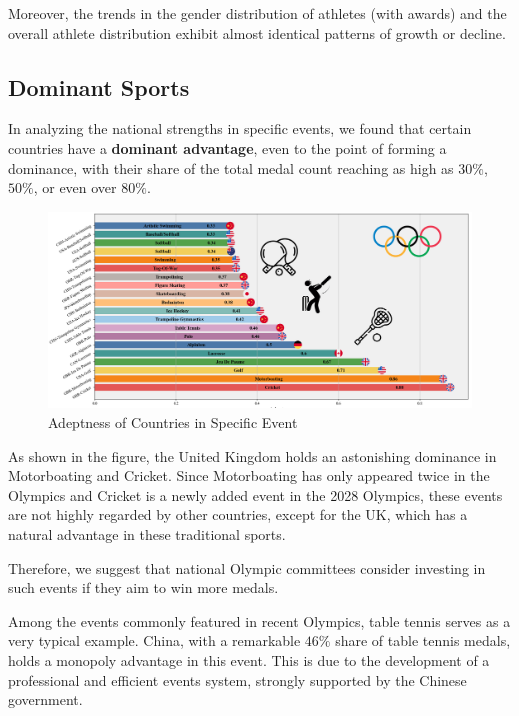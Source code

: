 \documentclass[12pt]{article}  %
\begin{document}
Moreover, the trends in the gender distribution of athletes (with awards) and the overall athlete distribution exhibit almost identical patterns of growth or decline.










\subsection{Dominant Sports}

In analyzing the national strengths in specific events, we found that certain countries have a \textbf{dominant advantage}, even to the point of forming a dominance, with their share of the total medal count reaching as high as \( 30\% \), \( 50\% \), or even over \textbf{\( 80\% \)}.



\begin{figure}[H]
	\centering
	\includegraphics[width=16cm]{img/Monopolized Sports.png}
	\caption{Adeptness of Countries in Specific Event}
	\label{fig:aa}
\end{figure}

As shown in the figure, the United Kingdom holds an astonishing dominance in Motorboating and Cricket. Since Motorboating has only appeared twice in the Olympics and Cricket is a newly added event in the 2028 Olympics, these events are not highly regarded by other countries, except for the UK, which has a natural advantage in these traditional sports.

Therefore, we suggest that national Olympic committees consider investing in such events if they aim to win more medals.


Among the events commonly featured in recent Olympics, table tennis serves as a very typical example. China, with a remarkable \( 46\% \) share of table tennis medals, holds a monopoly advantage in this event. This is due to the development of a professional and efficient events system, strongly supported by the Chinese government.
\end{document}
